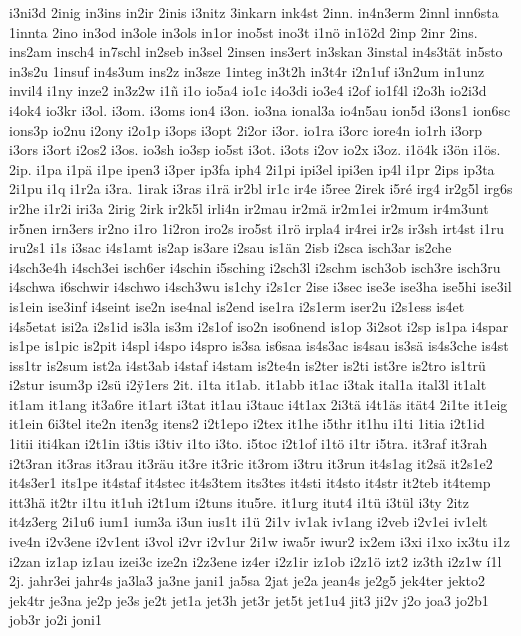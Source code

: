 {i3ni3d
2inig
in3ins
in2ir
2inis
i3nitz
3inkarn
ink4st
2inn.
in4n3erm
2innl
inn6sta
1innta
2ino
in3od
in3ole
in3ols
in1or
ino5st
ino3t
i1nö
in1ö2d
2inp
2inr
2ins.
ins2am
insch4
in7schl
in2seb
in3sel
2insen
ins3ert
in3skan
3instal
in4s3tät
in5sto
in3s2u
1insuf
in4s3um
ins2z
in3sze
1integ
in3t2h
in3t4r
i2n1uf
i3n2um
in1unz
invil4
i1ny
inze2
in3z2w
i1ñ
i1o
io5a4
io1c
i4o3di
io3e4
i2of
io1f4l
i2o3h
io2i3d
i4ok4
io3kr
i3ol.
i3om.
i3oms
ion4
i3on.
io3na
ional3a
io4n5au
ion5d
i3ons1
ion6sc
ions3p
io2nu
i2ony
i2o1p
i3ops
i3opt
2i2or
i3or.
io1ra
i3orc
iore4n
io1rh
i3orp
i3ors
i3ort
i2os2
i3os.
io3sh
io3sp
io5st
i3ot.
i3ots
i2ov
io2x
i3oz.
i1ö4k
i3ön
i1ös.
2ip.
i1pa
i1pä
i1pe
ipen3
i3per
ip3fa
iph4
2i1pi
ipi3el
ipi3en
ip4l
i1pr
2ips
ip3ta
2i1pu
i1q
i1r2a
i3ra.
1irak
i3ras
i1rä
ir2bl
ir1c
ir4e
i5ree
2irek
i5ré
irg4
ir2g5l
irg6s
ir2he
i1r2i
iri3a
2irig
2irk
ir2k5l
irli4n
ir2mau
ir2mä
ir2m1ei
ir2mum
ir4m3unt
ir5nen
irn3ers
ir2no
i1ro
1i2ron
iro2s
iro5st
i1rö
irpla4
ir4rei
ir2s
ir3sh
irt4st
i1ru
iru2s1
i1s
i3sac
i4s1amt
is2ap
is3are
i2sau
is1än
2isb
i2sca
isch3ar
is2che
i4sch3e4h
i4sch3ei
isch6er
i4schin
i5sching
i2sch3l
i2schm
isch3ob
isch3re
isch3ru
i4schwa
i6schwir
i4schwo
i4sch3wu
is1chy
i2s1cr
2ise
i3sec
ise3e
ise3ha
ise5hi
ise3il
is1ein
ise3inf
i4seint
ise2n
ise4nal
is2end
ise1ra
i2s1erm
iser2u
i2s1ess
is4et
i4s5etat
isi2a
i2s1id
is3la
is3m
i2s1of
iso2n
iso6nend
is1op
3i2sot
i2sp
is1pa
i4spar
is1pe
is1pic
is2pit
i4spl
i4spo
i4spro
is3sa
is6saa
is4s3ac
is4sau
is3sä
is4s3che
is4st
iss1tr
is2sum
ist2a
i4st3ab
i4staf
i4stam
is2te4n
is2ter
is2ti
ist3re
is2tro
is1trü
i2stur
isum3p
i2sü
i2^^ff1ers
2it.
i1ta
it1ab.
it1abb
it1ac
i3tak
ital1a
ital3l
it1alt
it1am
it1ang
it3a6re
it1art
i3tat
it1au
i3tauc
i4t1ax
2i3tä
i4t1äs
ität4
2i1te
it1eig
it1ein
6i3tel
ite2n
iten3g
itens2
i2t1epo
i2tex
it1he
i5thr
it1hu
i1ti
1itia
i2t1id
1itii
iti4kan
i2t1in
i3tis
i3tiv
i1to
i3to.
i5toc
i2t1of
i1tö
i1tr
i5tra.
it3raf
it3rah
i2t3ran
it3ras
it3rau
it3räu
it3re
it3ric
it3rom
i3tru
it3run
it4s1ag
it2sä
it2s1e2
it4s3er1
its1pe
it4staf
it4stec
it4s3tem
its3tes
it4sti
it4sto
it4str
it2teb
it4temp
itt3hä
it2tr
i1tu
it1uh
i2t1um
i2tuns
itu5re.
it1urg
itut4
i1tü
i3tül
i3ty
2itz
it4z3erg
2i1u6
ium1
ium3a
i3un
ius1t
i1ü
2i1v
iv1ak
iv1ang
i2veb
i2v1ei
iv1elt
ive4n
i2v3ene
i2v1ent
i3vol
i2vr
i2v1ur
2i1w
iwa5r
iwur2
ix2em
i3xi
i1xo
ix3tu
i1z
i2zan
iz1ap
iz1au
izei3c
ize2n
i2z3ene
iz4er
i2z1ir
iz1ob
i2z1ö
izt2
iz3th
i2z1w
í1l
2j.
jahr3ei
jahr4s
ja3la3
ja3ne
jani1
ja5sa
2jat
je2a
jean4s
je2g5
jek4ter
jekto2
jek4tr
je3na
je2p
je3s
je2t
jet1a
jet3h
jet3r
jet5t
jet1u4
jit3
ji2v
j2o
joa3
jo2b1
job3r
jo2i
joni1
}
